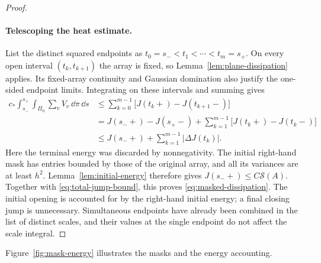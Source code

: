 \begin{proof}
\paragraph{Telescoping the heat estimate.}
List the distinct squared endpoints as
$t_0=s_-<t_1<\cdots<t_m=s_+$.
On every open interval $(t_k,t_{k+1})$ the array is fixed, so
Lemma~\ref{lem:plane-dissipation} applies.  Its fixed-array continuity
and Gaussian domination also justify the one-sided endpoint limits.
Integrating on these intervals and summing gives
\begin{align*}
 c_*\int_{s_-}^{s_+}\int_{\Pi_0}\sum_vV_v\,\dd\pi\,\dd s
 &\le\sum_{k=0}^{m-1}\bigl[J(t_k+)-J(t_{k+1}-)\bigr]\\
 &=J(s_-+)-J(s_+-)
       +\sum_{k=1}^{m-1}\bigl[J(t_k+)-J(t_k-)\bigr]\\
 &\le J(s_-+)+\sum_{k=1}^{m-1}|\Delta J(t_k)|.
\end{align*}
Here the terminal energy was discarded by nonnegativity.  The initial
right-hand mask has entries bounded by those of the original array,
and all its variances are at least $h^2$.  Lemma~\ref{lem:initial-energy}
therefore gives $J(s_-+)\le C\mathcal S(A)$.
Together with \eqref{eq:total-jump-bound}, this proves
\eqref{eq:masked-dissipation}.  The initial opening is accounted for
by the right-hand initial energy; a final closing jump is unnecessary.
Simultaneous endpoints have already been combined in the list of
distinct scales, and their values at the single endpoint do not affect
the scale integral.
\end{proof}

Figure~\ref{fig:mask-energy} illustrates the masks and the energy accounting.

